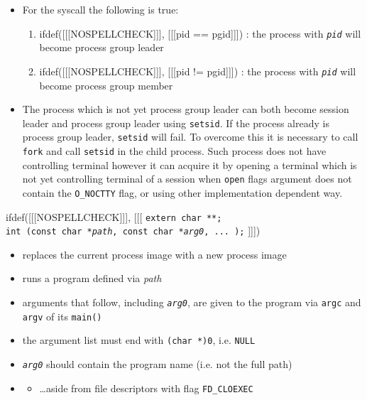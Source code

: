 \begin{itemize}
\item For the  syscall the following is true:
\begin{enumerate}
\item ifdef([[[NOSPELLCHECK]]], [[[pid == pgid]]]) : the process with
\emph{\texttt{pid}} will become process group leader
\item ifdef([[[NOSPELLCHECK]]], [[[pid != pgid]]]) : the process with
\emph{\texttt{pid}} will become process group member
\end{enumerate}
\item The process which is not yet process group leader can both become session
leader and process group leader using \texttt{setsid}. If the process already is
process group leader, \texttt{setsid} will fail. To overcome this it is necessary
to call \texttt{fork} and call \texttt{setsid} in the child process.
Such process does not have controlling terminal however it can acquire it by
opening a terminal which is not yet controlling terminal of a session when
\texttt{open} flags argument does not contain the \texttt{O\_NOCTTY} flag,
or using other implementation dependent way.
\end{itemize}




\begin{slide}
ifdef([[[NOSPELLCHECK]]], [[[
\texttt{extern char **;\\
int (const char *\emph{path}, const char *\emph{arg0}, ... );}
]]])
\begin{itemize}
\item replaces the current process image with a new process image
\item runs a program defined via \emph{path}
\item arguments that follow, including \emph{\texttt{arg0}}, are given to the
program via \texttt{argc} and \texttt{argv} of its \texttt{main()}
\item the argument list must end with \texttt{(char *)0}, i.e. \texttt{NULL}
\item \emph{\texttt{arg0}} should contain the program name (i.e. not the full
path)
\item {}
\begin{itemize}
\item \dots{}aside from file descriptors with flag \texttt{FD\_CLOEXEC}
\end{itemize}
\end{itemize}
\end{slide}

